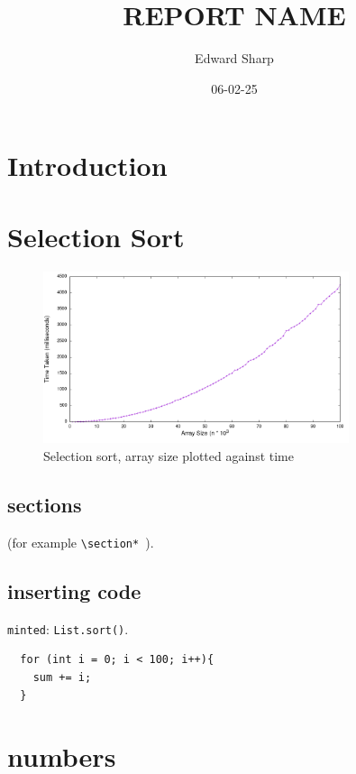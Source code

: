 \documentclass[a4paper,11pt]{article}
\begin{document}
\title{
    \textbf{REPORT NAME}
}
\author{Edward Sharp}
\date{06-02-25}

\maketitle

\section*{Introduction}


\section*{Selection Sort}

\begin{figure}[h!]
  \centering
  \includegraphics[width=0.8\textwidth]{SelectionSort_plot}
  \caption{Selection sort, array size plotted against time}
  \label{fig:SelectionSort_plot}
\end{figure}



\subsection{sections}

{\tt *} (for
example {\tt \textbackslash section* }).

\subsection*{inserting code}

{\tt minted}: {\tt List.sort()}.

\begin{verbatim}
  for (int i = 0; i < 100; i++){
    sum += i;
  }
\end{verbatim}

\section*{numbers}
\end{document}

